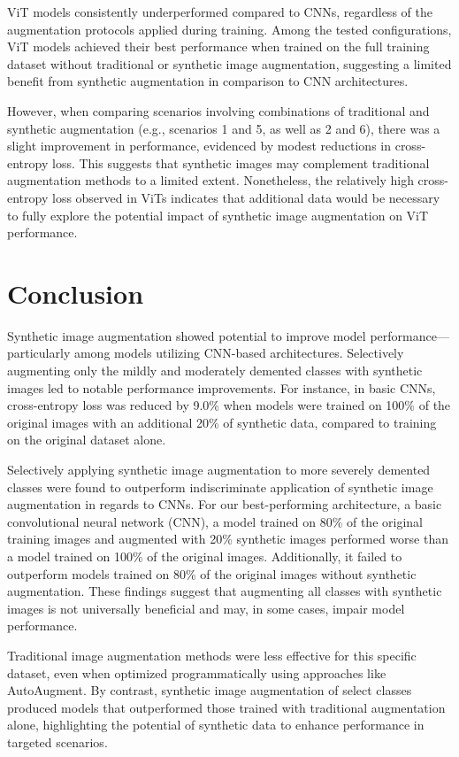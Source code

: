 \documentclass [MAS] {uclathes}
\begin{document}
ViT models consistently underperformed compared to CNNs, regardless of the augmentation protocols applied during 
training. Among the tested configurations, ViT models achieved their best performance when trained on the full training 
dataset without traditional or synthetic image augmentation, suggesting a limited benefit from synthetic augmentation in 
comparison to CNN architectures.

However, when comparing scenarios involving combinations of traditional and synthetic augmentation (e.g., scenarios 1 
and 5, as well as 2 and 6), there was a slight improvement in performance, evidenced by modest reductions in 
cross-entropy loss. This suggests that synthetic images may complement traditional augmentation methods to a limited 
extent. Nonetheless, the relatively high cross-entropy loss observed in ViTs indicates that additional data would be 
necessary to fully explore the potential impact of synthetic image augmentation on ViT performance.

\chapter{Conclusion}

Synthetic image augmentation showed potential to improve model performance---particularly among models utilizing 
CNN-based architectures. Selectively augmenting only the mildly and moderately demented classes with synthetic images 
led to notable performance improvements. For instance, in basic CNNs, cross-entropy loss was reduced by 9.0\% when 
models were trained on 100\% of the original images with an additional 20\% of synthetic data, compared to training on 
the original dataset alone. 

Selectively applying synthetic image augmentation to more severely demented classes were found to outperform 
indiscriminate application of synthetic image augmentation in regards to CNNs. For our best-performing architecture, a 
basic convolutional neural network (CNN), a model trained on 80\% of the original training images and augmented with 
20\% synthetic images performed worse than a model trained on 100\% of the original images. Additionally, it failed to 
outperform models trained on 80\% of the original images without synthetic augmentation. These findings suggest that 
augmenting all classes with synthetic images is not universally beneficial and may, in some cases, impair model 
performance.

Traditional image augmentation methods were less effective for this specific dataset, even when optimized 
programmatically using approaches like AutoAugment. By contrast, synthetic image augmentation of select classes produced 
models that outperformed those trained with traditional augmentation alone, highlighting the potential of synthetic data 
to enhance performance in targeted scenarios.
\end{document}
